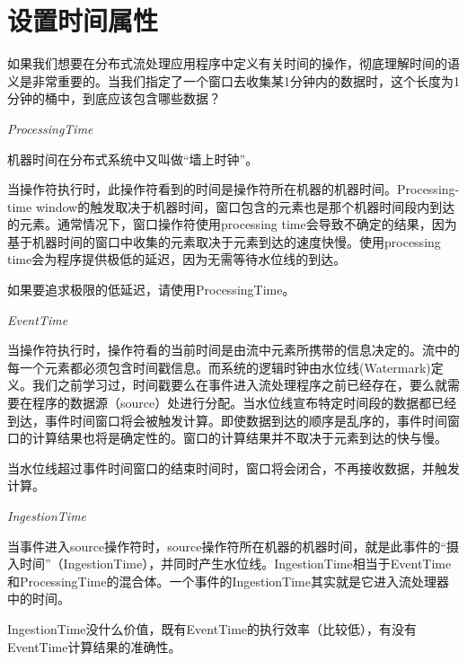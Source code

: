 \documentclass[cn,11pt,chinese]{elegantbook}
\renewenvironment{quote}{\begin{customblockquote}\list{}{\rightmargin=0em\leftmargin=0em}%
\item\relax\color{blockquote-text}\ignorespaces}{\unskip\unskip\endlist\end{customblockquote}}
\begin{document}
\hypertarget{ux8bbeux7f6eux65f6ux95f4ux5c5eux6027}{%
\section{设置时间属性}\label{ux8bbeux7f6eux65f6ux95f4ux5c5eux6027}}

如果我们想要在分布式流处理应用程序中定义有关时间的操作，彻底理解时间的语义是非常重要的。当我们指定了一个窗口去收集某1分钟内的数据时，这个长度为1分钟的桶中，到底应该包含哪些数据？

\emph{ProcessingTime}

\begin{quote}
机器时间在分布式系统中又叫做``墙上时钟''。
\end{quote}

当操作符执行时，此操作符看到的时间是操作符所在机器的机器时间。Processing-time
window的触发取决于机器时间，窗口包含的元素也是那个机器时间段内到达的元素。通常情况下，窗口操作符使用processing
time会导致不确定的结果，因为基于机器时间的窗口中收集的元素取决于元素到达的速度快慢。使用processing
time会为程序提供极低的延迟，因为无需等待水位线的到达。

\begin{quote}
如果要追求极限的低延迟，请使用ProcessingTime。
\end{quote}

\emph{EventTime}

当操作符执行时，操作符看的当前时间是由流中元素所携带的信息决定的。流中的每一个元素都必须包含时间戳信息。而系统的逻辑时钟由水位线(Watermark)定义。我们之前学习过，时间戳要么在事件进入流处理程序之前已经存在，要么就需要在程序的数据源（source）处进行分配。当水位线宣布特定时间段的数据都已经到达，事件时间窗口将会被触发计算。即使数据到达的顺序是乱序的，事件时间窗口的计算结果也将是确定性的。窗口的计算结果并不取决于元素到达的快与慢。

\begin{quote}
当水位线超过事件时间窗口的结束时间时，窗口将会闭合，不再接收数据，并触发计算。
\end{quote}

\emph{IngestionTime}

当事件进入source操作符时，source操作符所在机器的机器时间，就是此事件的``摄入时间''（IngestionTime），并同时产生水位线。IngestionTime相当于EventTime和ProcessingTime的混合体。一个事件的IngestionTime其实就是它进入流处理器中的时间。

\begin{quote}
IngestionTime没什么价值，既有EventTime的执行效率（比较低），有没有EventTime计算结果的准确性。
\end{quote}
\end{document}
